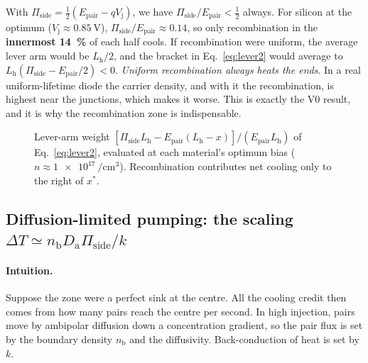 \documentclass[11pt,a4paper]{article}
\newcommand{\Ep}{E_{\mathrm{pair}}}
\newcommand{\Vj}{V_{\mathrm{j}}}
\newcommand{\Da}{D_{\mathrm{a}}}
\newcommand{\nb}{n_{\mathrm{b}}}
\newcommand{\Pis}{\Pi_{\mathrm{side}}}
\newcommand{\Lh}{L_{\mathrm{h}}}
\begin{document}
\begin{insight}
With $\Pis=\tfrac12(\Ep-q\Vj)$, we have $\Pis/\Ep<\tfrac12$ always. For silicon at the optimum ($\Vj\approx\SI{0.85}{\volt}$), $\Pis/\Ep\approx0.14$, so only recombination in the \textbf{innermost \SI{14}{\percent}} of each half cools. If recombination were uniform, the average lever arm would be $\Lh/2$, and the bracket in Eq.~\eqref{eq:lever2} would average to $\Lh(\Pis-\Ep/2)<0$. \emph{Uniform recombination always heats the ends}. In a real uniform-lifetime diode the carrier density, and with it the recombination, is highest near the junctions, which makes it worse. This is exactly the V0 result, and it is why the recombination zone is indispensable.
\end{insight}

\begin{figure}[h]
\centering
{}
\caption{Lever-arm weight $[\Pis\Lh-\Ep(\Lh-x)]/(\Ep\Lh)$ of Eq.~\eqref{eq:lever2}, evaluated at each material's optimum bias ($n\approx\SI{1e17}{\per\centi\metre\cubed}$). Recombination contributes net cooling only to the right of $x^\ast$.}
\label{fig:lever}
\end{figure}

\subsection{Diffusion-limited pumping: the scaling $\Delta T\simeq \nb\Da\Pis/k$}
\paragraph{Intuition.} Suppose the zone were a perfect sink at the centre. All the cooling credit then comes from how many pairs reach the centre per second. In high injection, pairs move by ambipolar diffusion down a concentration gradient, so the pair flux is set by the boundary density $\nb$ and the diffusivity. Back-conduction of heat is set by $k$.
\end{document}
